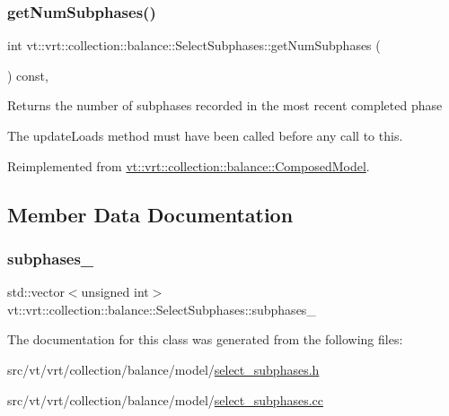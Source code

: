 \subsubsection{\texorpdfstring{get\+Num\+Subphases()}{getNumSubphases()}}
{\footnotesize\ttfamily int vt\+::vrt\+::collection\+::balance\+::\+Select\+Subphases\+::get\+Num\+Subphases (\begin{DoxyParamCaption}{ }\end{DoxyParamCaption}) const\hspace{0.3cm}{\ttfamily [override]}, {\ttfamily [virtual]}}

Returns the number of subphases recorded in the most recent completed phase

The {\ttfamily update\+Loads} method must have been called before any call to this. 

Reimplemented from \hyperlink{classvt_1_1vrt_1_1collection_1_1balance_1_1_composed_model_a744a16572614d11e554b1bf53b7c57f6}{vt\+::vrt\+::collection\+::balance\+::\+Composed\+Model}.



\subsection{Member Data Documentation}
\mbox{\label{classvt_1_1vrt_1_1collection_1_1balance_1_1_select_subphases_ad9ad62b67851546a4377ee6a4e17181e}} 
\subsubsection{\texorpdfstring{subphases\+\_\+}{subphases\_}}
{\footnotesize\ttfamily std\+::vector$<$unsigned int$>$ vt\+::vrt\+::collection\+::balance\+::\+Select\+Subphases\+::subphases\+\_\+}



The documentation for this class was generated from the following files\+:\begin{DoxyCompactItemize}
\item 
src/vt/vrt/collection/balance/model/\hyperlink{select__subphases_8h}{select\+\_\+subphases.\+h}\item 
src/vt/vrt/collection/balance/model/\hyperlink{select__subphases_8cc}{select\+\_\+subphases.\+cc}\end{DoxyCompactItemize}
